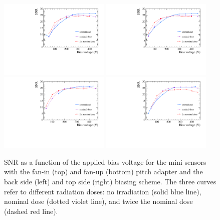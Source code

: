 \begin{figure}[]
\centering
\includegraphics[width=0.47\textwidth]{figs/CombineSNRvsBias/cSNRvsBias_FanIn_Back.pdf}
\includegraphics[width=0.47\textwidth]{figs/CombineSNRvsBias/cSNRvsBias_FanIn_Top.pdf}
\includegraphics[width=0.47\textwidth]{figs/CombineSNRvsBias/cSNRvsBias_FanUp_Back.pdf}
\includegraphics[width=0.47\textwidth]{figs/CombineSNRvsBias/cSNRvsBias_FanUp_Top.pdf}
\caption[SNR as a function of the applied bias voltage for the mini sensors.]{SNR as a function of the applied bias voltage for the mini sensors with the fan-in (top) and fan-up (bottom) pitch adapter and the back side (left) and top side (right) biasing scheme. The three curves refer to different radiation doses: no irradiation (solid blue line), nominal dose (dotted violet line), and twice the nominal dose (dashed red line).}
\label{fig:DepletionVoltageM}
\end{figure}

